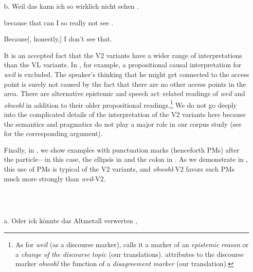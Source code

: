 \begin{styleMoutonExampleAlpha}
b.  Weil    das  kann  ich  so  wirklich  nicht  sehen  .
\end{styleMoutonExampleAlpha}

\begin{styleMoutonExampleAlphaGloss}
because  that  can  I  so  really    not  see  .
\end{styleMoutonExampleAlphaGloss}

\begin{styleMoutonExamplesTransAlpha}
Because[, honestly,] I don’t see that.
\end{styleMoutonExamplesTransAlpha}

\begin{styleMoutonTextAfterExample}
It is an accepted fact that the V2 variants have a wider range of interpretations than the VL variants. In , for example, a propositional causal interpretation for \textit{weil} is excluded. The speaker’s thinking that he might get connected to the access point is surely not caused by the fact that there are no other access points in the area. There are alternative epistemic and speech act–related readings of \textit{weil} and \textit{obwohl} in addition to their older propositional readings.\footnote{As for \textit{weil} (as a discourse marker), \citet{Günthner1996} calls it a marker of an \textit{epistemic} \textit{reason} or a \textit{change} \textit{of} \textit{the} \textit{discourse} \textit{topic} (our translations). \citet{Günthner2000} attributes to the discourse marker \textit{obwohl} the function of a \textit{disagreement} \textit{marker} (our translation).} We do not go deeply into the complicated details of the interpretation of the V2 variants here because the semantics and pragmatics do not play a major role in our corpus study (see  for the corresponding argument).
\end{styleMoutonTextAfterExample}

\begin{styleMoutonTextBeforeExample}
Finally, in , we show examples with punctuation marks (henceforth PMs) after the particle—in this case, the ellipsis in  and the colon in . As we demonstrate in , this use of PMs is typical of the V2 variants, and \textit{obwohl}{}-V2 favors such PMs much more strongly than \textit{weil}{}-V2.
\end{styleMoutonTextBeforeExample}

\begin{styleMoutonExample}
\ea%
    \label{ex:key:4}
    \gll\\
        \\
    \glt
    \z

          a.  Oder  ich  könnte  das  Altmetall    verwerten  ,
\end{styleMoutonExample}

